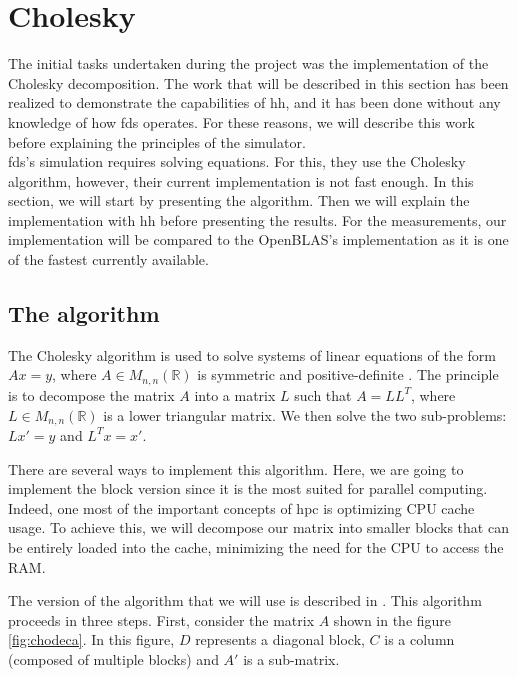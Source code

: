 
\clearpage{}
\section{Cholesky}

The initial tasks undertaken during the project was the implementation of the
Cholesky decomposition. The work that will be described in this section has been
realized to demonstrate the capabilities of \gls{hh}, and it has been done
without any knowledge of how \gls{fds} operates. For these reasons, we will
describe this work before explaining the principles of the simulator.\\

\gls{fds}'s simulation requires solving equations. For this, they use the
Cholesky algorithm, however, their current implementation is not fast enough. In
this section, we will start by presenting the algorithm. Then we will explain
the implementation with \gls{hh} before presenting the results. For the
measurements, our implementation will be compared to the OpenBLAS's
implementation as it is one of the fastest currently available.

\subsection{The algorithm}
\label{sec:choalgo}

The Cholesky algorithm is used to solve systems of linear equations of the form
$Ax = y$, where $A \in M_{n,n}(\mathbb{R})$ is symmetric and positive-definite
\cite{choleskywiki}. The principle is to decompose the matrix $A$ into a matrix
$L$ such that $A = LL^{T}$, where $L \in M_{n,n}(\mathbb{R})$ is a lower
triangular matrix. We then solve the two sub-problems: $Lx' = y$ and $L^{T}x =
x'$.

There are several ways to implement this algorithm. Here, we are going to
implement the block version since it is the most suited for parallel computing.
Indeed, one most of the important concepts of \gls{hpc} is optimizing CPU cache
usage. To achieve this, we will decompose our matrix into smaller blocks that
can be entirely loaded into the cache, minimizing the need for the CPU to access
the RAM.

The version of the algorithm that we will use is described in
\cite{choleskyblock}. This algorithm proceeds in three steps. First, consider
the matrix $A$ shown in the figure \ref{fig:chodeca}. In this figure, $D$
represents a diagonal block, $C$ is a column (composed of multiple blocks) and
$A'$ is a sub-matrix.

